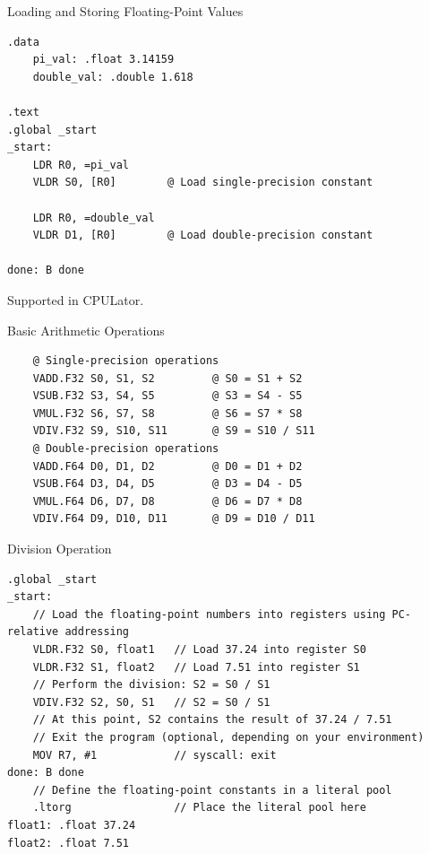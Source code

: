 \documentclass[aspectratio=169]{beamer}
\begin{document}
\begin{frame}[fragile]{Loading and Storing Floating-Point Values}
\begin{verbatim}
.data
    pi_val: .float 3.14159
    double_val: .double 1.618

.text
.global _start
_start:
    LDR R0, =pi_val
    VLDR S0, [R0]        @ Load single-precision constant
    
    LDR R0, =double_val
    VLDR D1, [R0]        @ Load double-precision constant
	
done: B done
\end{verbatim}
Supported in CPULator.
\end{frame}

\begin{frame}[fragile]{Basic Arithmetic Operations}
    \begin{verbatim}
    @ Single-precision operations
    VADD.F32 S0, S1, S2         @ S0 = S1 + S2
    VSUB.F32 S3, S4, S5         @ S3 = S4 - S5
    VMUL.F32 S6, S7, S8         @ S6 = S7 * S8
    VDIV.F32 S9, S10, S11       @ S9 = S10 / S11
    @ Double-precision operations
    VADD.F64 D0, D1, D2         @ D0 = D1 + D2
    VSUB.F64 D3, D4, D5         @ D3 = D4 - D5
    VMUL.F64 D6, D7, D8         @ D6 = D7 * D8
    VDIV.F64 D9, D10, D11       @ D9 = D10 / D11
    \end{verbatim}
\end{frame}


\begin{frame}[fragile]{Division Operation}
\begin{verbatim}
.global _start
_start:
    // Load the floating-point numbers into registers using PC-relative addressing
    VLDR.F32 S0, float1   // Load 37.24 into register S0
    VLDR.F32 S1, float2   // Load 7.51 into register S1
    // Perform the division: S2 = S0 / S1
    VDIV.F32 S2, S0, S1   // S2 = S0 / S1
    // At this point, S2 contains the result of 37.24 / 7.51
    // Exit the program (optional, depending on your environment)
    MOV R7, #1            // syscall: exit
done: B done
    // Define the floating-point constants in a literal pool
    .ltorg                // Place the literal pool here
float1: .float 37.24
float2: .float 7.51
\end{verbatim}
\end{frame}

\end{document}
